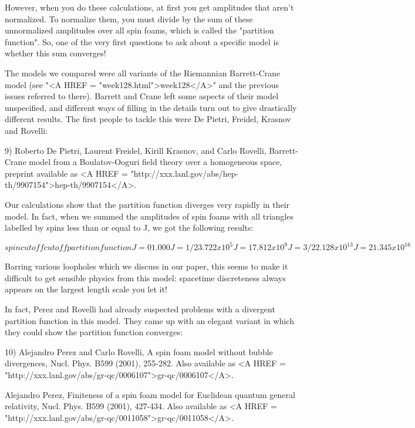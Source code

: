 However, when you do these calculations, at first you get amplitudes
that aren't normalized.  To normalize them, you must divide by the sum
of these unnormalized amplitudes over all spin foams, which is called
the "partition function".  So, one of the very first questions to ask
about a specific model is whether this sum converges!

The models we compared were all variants of the Riemannian Barrett-Crane
model (see "<A HREF = "week128.html">week128</A>" and the
previous issues referred to there).  Barrett and Crane left some aspects
of their model unspecified, and different ways of filling in the details
turn out to give drastically different results.  The first people to
tackle this were De Pietri, Freidel, Krasnov and Rovelli:

9) Roberto De Pietri, Laurent Freidel, Kirill Krasnov, and Carlo
Rovelli, Barrett-Crane model from a Boulatov-Ooguri field theory over 
a homogeneous space, preprint available as <A HREF = "http://xxx.lanl.gov/abs/hep-th/9907154">hep-th/9907154</A>. 

Our calculations show that the partition function diverges very rapidly 
in their model.  In fact, when we summed the amplitudes of spin foams
with all triangles labelled by spins less than or equal to J, 
we got the following results:

$$
spin cutoff               cutoff partition function 

J = 0                         1.000 
J = 1/2                       3.722 x 10^{5}
J = 1                         7.812 x 10^{9}
J = 3/2                       2.128 x 10^{13}
J = 2                         1.345 x 10^{16}
$$
    
Barring various loopholes which we discuss in our paper, this seems
to make it difficult to get sensible physics from this model: spacetime
discreteness always appears on the largest length scale you let it!

In fact, Perez and Rovelli had already suspected problems with a divergent
partition function in this model.  They came up with an elegant variant
in which they could show the partition function converges:

10) Alejandro Perez and Carlo Rovelli, A spin foam model without bubble
divergences, Nucl. Phys. B599 (2001), 255-282.  Also available as
<A HREF = "http://xxx.lanl.gov/abs/gr-qc/0006107">gr-qc/0006107</A>. 

Alejandro Perez, Finiteness of a spin foam model for Euclidean quantum
general relativity, Nucl. Phys. B599 (2001), 427-434.  Also available as
<A HREF = "http://xxx.lanl.gov/abs/gr-qc/0011058">gr-qc/0011058</A>.

